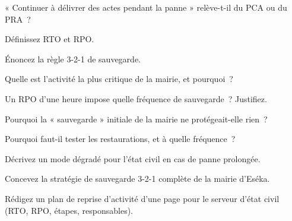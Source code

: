 \begin{boxexo}[title={\ding{45}\quad Exercice~17.1. PCA ou PRA \niveaubase}]
« Continuer à délivrer des actes pendant la panne » relève-t-il du PCA ou du
PRA~?
\end{boxexo}

\begin{boxexo}[title={\ding{45}\quad Exercice~17.2. Les indicateurs \niveaubase}]
Définissez RTO et RPO.
\end{boxexo}

\begin{boxexo}[title={\ding{45}\quad Exercice~17.3. La règle 3-2-1 \niveaubase}]
Énoncez la règle 3-2-1 de sauvegarde.
\end{boxexo}

\begin{boxexo}[title={\ding{45}\quad Exercice~17.4. BIA \niveaumoyen}]
Quelle est l'activité la plus critique de la mairie, et pourquoi~?
\end{boxexo}

\begin{boxexo}[title={\ding{45}\quad Exercice~17.5. RPO et fréquence \niveaumoyen}]
Un RPO d'une heure impose quelle fréquence de sauvegarde~? Justifiez.
\end{boxexo}

\begin{boxexo}[title={\ding{45}\quad Exercice~17.6. Fausse sauvegarde \niveaumoyen}]
Pourquoi la « sauvegarde » initiale de la mairie ne protégeait-elle rien~?
\end{boxexo}

\begin{boxexo}[title={\ding{45}\quad Exercice~17.7. Tester \niveaumoyen}]
Pourquoi faut-il tester les restaurations, et à quelle fréquence~?
\end{boxexo}

\begin{boxexo}[title={\ding{45}\quad Exercice~17.8. Mode dégradé \niveaumoyen}]
Décrivez un mode dégradé pour l'état civil en cas de panne prolongée.
\end{boxexo}

\begin{boxexo}[title={\ding{45}\quad Exercice~17.9. Stratégie 3-2-1 \niveauexpert}]
Concevez la stratégie de sauvegarde 3-2-1 complète de la mairie d'Eséka.
\end{boxexo}

\begin{boxexo}[title={\ding{45}\quad Exercice~17.10. PRA rédigé \niveauexpert}]
Rédigez un plan de reprise d'activité d'une page pour le serveur d'état civil
(RTO, RPO, étapes, responsables).
\end{boxexo}

